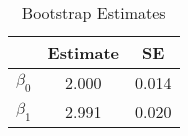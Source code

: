 \begin{table}[htb]
\centering
\caption{Bootstrap Estimates}
\label{table:ea3:ps1:q3b:tab2}
\begin{tabular}{lcc}
\hline
 & Estimate & SE \\
\hline\hline
$\beta_0$ & 2.000 & 0.014 \\
$\beta_1$ & 2.991 & 0.020 \\
\hline
\end{tabular}
\end{table}
